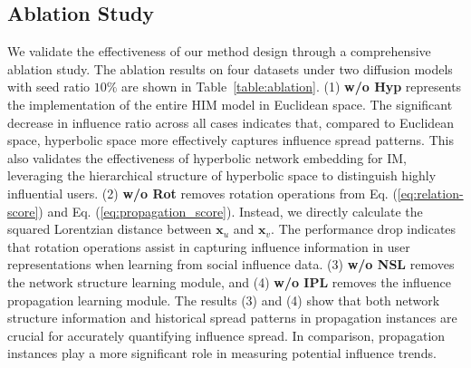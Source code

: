 \subsection{Ablation Study}
We validate the effectiveness of our method design through a comprehensive ablation study.
The ablation results on four datasets under two diffusion models with seed ratio $10\%$ are shown in Table~\ref{table:ablation}.
(1) \textbf{w/o Hyp} represents the implementation of the entire HIM model in Euclidean space. 
The significant decrease in influence ratio across all cases indicates that, compared to Euclidean space, hyperbolic space more effectively captures influence spread patterns.
This also validates the effectiveness of hyperbolic network embedding for IM, leveraging the hierarchical structure of hyperbolic space to distinguish highly influential users.
(2) \textbf{w/o Rot} removes rotation operations from Eq. (\ref{eq:relation-score}) and Eq. (\ref{eq:propagation_score}).
Instead, we directly calculate the squared Lorentzian distance between $\mathbf{x}_u$ and $\mathbf{x}_v$.
The performance drop indicates that rotation operations assist in capturing influence information in user representations when learning from social influence data.
(3) \textbf{w/o NSL} removes the network structure learning module, and (4) \textbf{w/o IPL} removes the influence propagation learning module.
The results (3) and (4) show that both network structure information and historical spread patterns in propagation instances are crucial for accurately quantifying influence spread. In comparison, propagation instances play a more significant role in measuring potential influence trends.


